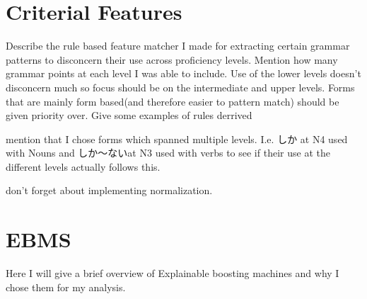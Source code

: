 \section{Criterial Features}
Describe the rule based feature matcher I made for extracting certain grammar patterns to disconcern their use
across proficiency levels. Mention how many grammar points at each level I was able to include. Use of the lower
levels doesn't disconcern much so focus should be on the intermediate and upper levels.  Forms that are mainly form
based(and therefore easier to pattern match) should be given priority over. Give some examples of rules derrived

mention that I chose forms which spanned multiple levels. I.e. しか at N4 used with Nouns and しか〜ないat N3 used
with verbs to see if their use at the different levels actually follows this.

don't forget about implementing normalization.

\section{EBMS}
 Here I will give a brief overview of Explainable boosting machines and why I chose them for my analysis.


